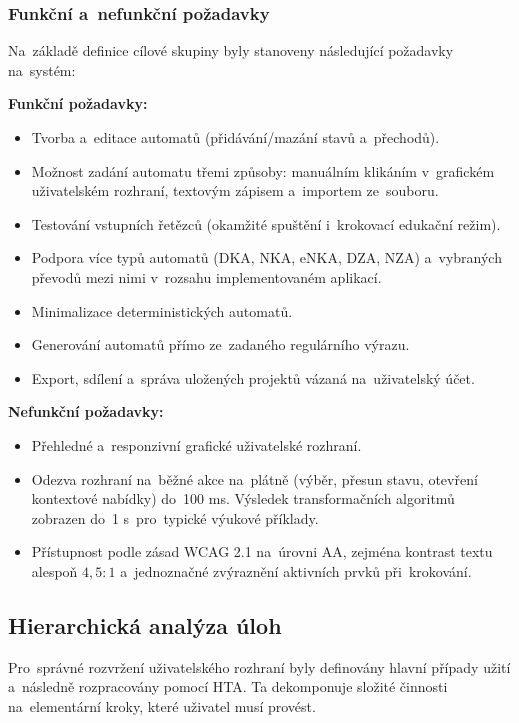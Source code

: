 \documentclass[
  master,
  program=ainfvs,
  printversion,
  figures=false,
  tables=false,
  glossaries,
  index
]{kidiplom}
\begin{document}
\subsubsection{Funkční a~nefunkční požadavky}
Na~základě definice cílové skupiny byly stanoveny následující požadavky na~systém:

\textbf{Funkční požadavky:}
\begin{itemize}
    \item Tvorba a~editace automatů (přidávání/mazání stavů a~přechodů).
    \item Možnost zadání automatu třemi způsoby: manuálním klikáním v~grafickém uživatelském rozhraní, textovým zápisem a~importem ze~souboru.
    \item Testování vstupních řetězců (okamžité spuštění i~krokovací edukační režim).
    \item Podpora více typů automatů (\gls{DKA}, \gls{NKA}, \gls{eNKA}, \gls{DZA}, \gls{NZA}) a~vybraných převodů mezi nimi v~rozsahu implementovaném aplikací.
    \item Minimalizace deterministických automatů.
    \item Generování automatů přímo ze~zadaného regulárního výrazu.
    \item Export, sdílení a~správa uložených projektů vázaná na~uživatelský účet.
\end{itemize}

\textbf{Nefunkční požadavky:}
\begin{itemize}
    \item Přehledné a~responzivní grafické uživatelské rozhraní.
    \item Odezva rozhraní na~běžné akce na~plátně (výběr, přesun stavu, otevření kontextové nabídky) do~100 ms. Výsledek transformačních algoritmů zobrazen do~1 s~pro~typické výukové příklady.
    \item Přístupnost podle zásad WCAG 2.1 na~úrovni AA, zejména kontrast textu alespoň $4{,}5{ : }1$ a~jednoznačné zvýraznění aktivních prvků při~krokování.
\end{itemize}

\subsection{Hierarchická analýza úloh}
Pro~správné rozvržení uživatelského rozhraní byly definovány hlavní případy užití a~následně rozpracovány pomocí \gls{HTA}. Ta dekomponuje složité činnosti na~elementární kroky, které uživatel musí provést.
\end{document}

